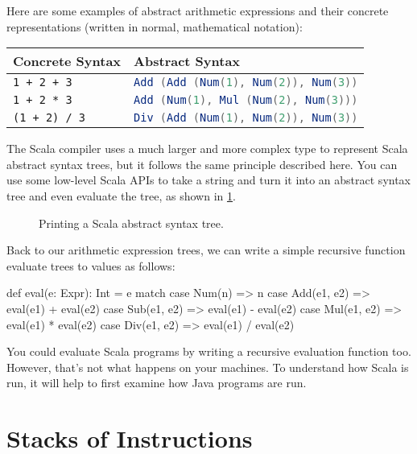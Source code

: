 Here are some examples of abstract arithmetic expressions and their
concrete representations (written in normal, mathematical notation):

\begin{tabular}{l|l}
Concrete Syntax & Abstract Syntax \\
\hline
\texttt{1 + 2 + 3} & \lstinline[language=scala]|Add (Add (Num(1), Num(2)), Num(3))| \\
\texttt{1 + 2 * 3} & \lstinline[language=scala]|Add (Num(1), Mul (Num(2), Num(3)))| \\
\texttt{(1 + 2) / 3} & \lstinline[language=scala]|Div (Add (Num(1), Num(2)), Num(3))|
\end{tabular}

The Scala compiler uses a much larger and more complex type to represent Scala
abstract syntax trees, but it follows the same principle described here. You can
use some low-level Scala APIs to take a string and turn it into an abstract syntax
tree and even evaluate the tree, as shown in \cref{scala_ast}.

\begin{figure}
  \caption{Printing a Scala abstract syntax tree.}
  \label{scala_ast}
  \end{figure}

Back to our arithmetic expression trees, we can write a simple recursive
function evaluate trees to values as follows:

\begin{scalacode}
def eval(e: Expr): Int = e match {
  case Num(n) => n
  case Add(e1, e2) => eval(e1) + eval(e2)
  case Sub(e1, e2) => eval(e1) - eval(e2)
  case Mul(e1, e2) => eval(e1) * eval(e2)
  case Div(e1, e2) => eval(e1) / eval(e2)
}
\end{scalacode}

You could evaluate Scala programs by writing a recursive evaluation
function too. However, that's not what happens on your machines. To
understand how Scala is run, it will help to first examine how Java
programs are run.

\section{Stacks of Instructions}


